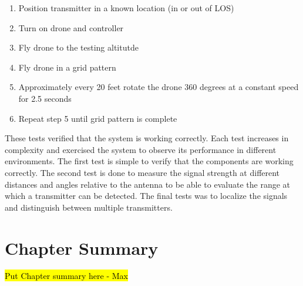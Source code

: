\begin{enumerate}
   \item Position transmitter in a known location (in or out of LOS)
   \item Turn on drone and controller
   \item Fly drone to the testing altitutde
   \item Fly drone in a grid pattern
   \item Approximately every 20 feet rotate the drone 360 degrees at a constant speed for 2.5 seconds
   \item Repeat step 5 until grid pattern is complete
\end{enumerate} \par

These tests verified that the system is working correctly. Each test increases in complexity and exercised the system to observe its performance in different environments. The first test is simple to verify that the components are working correctly. The second test is done to measure the signal strength at different distances and angles relative to the antenna to be able to evaluate the range at which a transmitter can be detected. The final tests was to localize the signals and distinguish between multiple transmitters.

\section{Chapter Summary}
\hl{Put Chapter summary here - Max}
